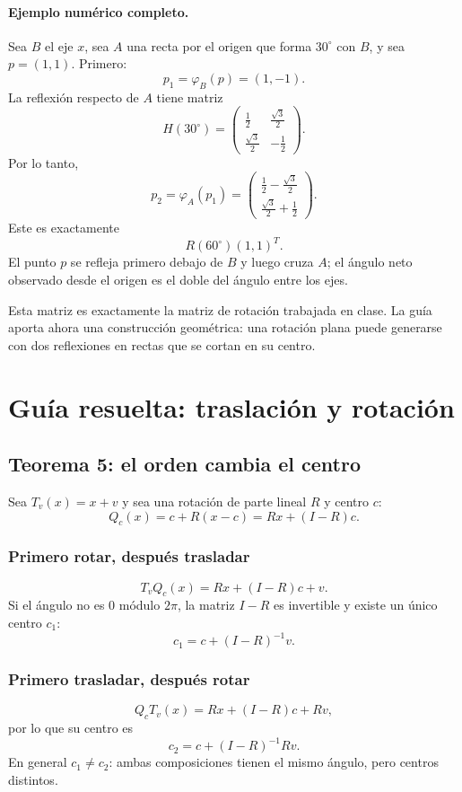 \paragraph{Ejemplo numérico completo.}
Sea \(B\) el eje \(x\), sea \(A\) una recta por el origen que forma \(30^\circ\) con \(B\),
y sea \(p=(1,1)\). Primero:
\[
  p_1=\varphi_B(p)=(1,-1).
\]
La reflexión respecto de \(A\) tiene matriz
\[
H(30^\circ)=
\begin{pmatrix}
\frac12&\frac{\sqrt3}{2}\\
\frac{\sqrt3}{2}&-\frac12
\end{pmatrix}.
\]
Por lo tanto,
\[
p_2=\varphi_A(p_1)
=
\begin{pmatrix}
\frac12-\frac{\sqrt3}{2}\\[1mm]
\frac{\sqrt3}{2}+\frac12
\end{pmatrix}.
\]
Este es exactamente
\[
R(60^\circ)(1,1)^T.
\]
El punto \(p\) se refleja primero debajo de \(B\) y luego cruza \(A\); el ángulo neto observado
desde el origen es el doble del ángulo entre los ejes.

\begin{idea}
Esta matriz es exactamente la matriz de rotación trabajada en clase. La guía aporta ahora
una construcción geométrica: una rotación plana puede generarse con dos reflexiones en
rectas que se cortan en su centro.
\end{idea}

\section{Guía resuelta: traslación y rotación}

\subsection{Teorema 5: el orden cambia el centro}

Sea \(T_v(x)=x+v\) y sea una rotación de parte lineal \(R\) y centro \(c\):
\[
  Q_c(x)=c+R(x-c)=Rx+(I-R)c.
\]

\subsubsection*{Primero rotar, después trasladar}
\[
  T_vQ_c(x)=Rx+(I-R)c+v.
\]
Si el ángulo no es \(0\) módulo \(2\pi\), la matriz \(I-R\) es invertible y existe un único
centro \(c_1\):
\[
  \boxed{c_1=c+(I-R)^{-1}v}.
\]

\subsubsection*{Primero trasladar, después rotar}
\[
  Q_cT_v(x)=Rx+(I-R)c+Rv,
\]
por lo que su centro es
\[
  \boxed{c_2=c+(I-R)^{-1}Rv}.
\]
En general \(c_1\neq c_2\): ambas composiciones tienen el mismo ángulo, pero centros distintos.

